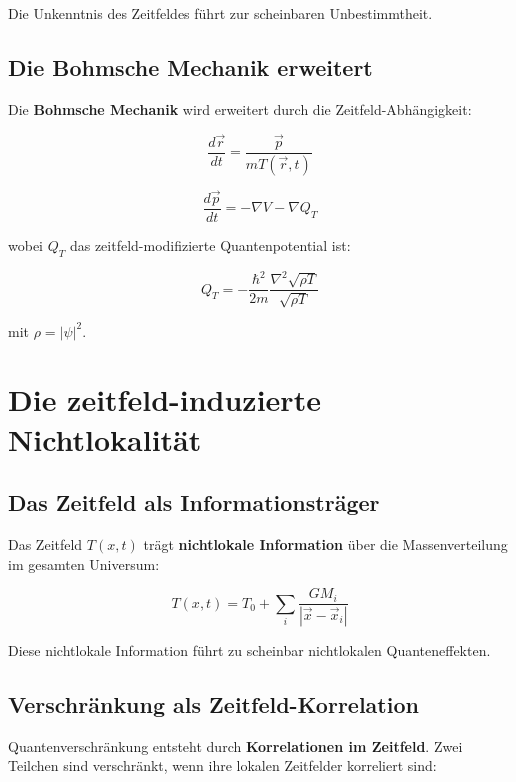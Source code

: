 \documentclass[12pt,a4paper]{report}
\begin{document}
	Die Unkenntnis des Zeitfeldes führt zur scheinbaren Unbestimmtheit.
	
	\subsection{Die Bohmsche Mechanik erweitert}
	
	Die \textbf{Bohmsche Mechanik} wird erweitert durch die Zeitfeld-Abhängigkeit:
	
	\begin{equation}
		\frac{d\vec{r}}{dt} = \frac{\vec{p}}{m T(\vec{r},t)}
	\end{equation}
	
	\begin{equation}
		\frac{d\vec{p}}{dt} = -\nabla V - \nabla Q_T
	\end{equation}
	
	wobei $Q_T$ das zeitfeld-modifizierte Quantenpotential ist:
	
	\begin{equation}
		Q_T = -\frac{\hbar^2}{2m}\frac{\nabla^2\sqrt{\rho T}}{\sqrt{\rho T}}
	\end{equation}
	
	mit $\rho = |\psi|^2$.
	
	\section{Die zeitfeld-induzierte Nichtlokalität}
	
	\subsection{Das Zeitfeld als Informationsträger}
	
	Das Zeitfeld $T(x,t)$ trägt \textbf{nichtlokale Information} über die Massenverteilung im gesamten Universum:
	
	\begin{equation}
		T(x,t) = T_0 + \sum_i \frac{GM_i}{|\vec{x} - \vec{x}_i|}
	\end{equation}
	
	Diese nichtlokale Information führt zu scheinbar nichtlokalen Quanteneffekten.
	
	\subsection{Verschränkung als Zeitfeld-Korrelation}
	
	Quantenverschränkung entsteht durch \textbf{Korrelationen im Zeitfeld}. Zwei Teilchen sind verschränkt, wenn ihre lokalen Zeitfelder korreliert sind:
	
\end{document}
